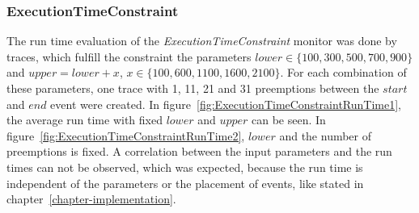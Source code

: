 \subsubsection{ExecutionTimeConstraint}
	The run time evaluation of the \textit{ExecutionTimeConstraint} monitor was done by traces, which fulfill the constraint the parameters $lower\in\{100,300,500,700,900\}$ and $upper=lower+x$, $x\in\{100,600,1100,1600,2100\}$. For each combination of these parameters, one trace with 1, 11, 21 and 31 preemptions between the $start$ and $end$ event were created. In figure~\ref{fig:ExecutionTimeConstraintRunTime1}, the average run time with fixed $lower$ and $upper$ can be seen. In figure~\ref{fig:ExecutionTimeConstraintRunTime2}, $lower$ and the number of preemptions is fixed. A correlation between the input parameters and the run times can not be observed, which was expected, because the run time is independent of the parameters or the placement of events, like stated in chapter~\ref{chapter-implementation}.
